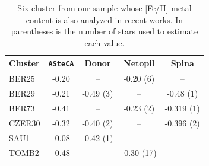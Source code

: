 \documentclass{aa}
\begin{document}
  \begin{table}
  \caption{Six cluster from our sample whose [Fe/H] metal content is also
  analyzed in recent works. In parentheses is the number of stars used to estimate
  each value.}
  \label{tab:metal}
  \centering
  \begin{tabular}{lcccc}
  \hline\hline
  Cluster & \texttt{ASteCA} & Donor & Netopil & Spina \\
  \hline %
   BER25  & -0.20  & --         & -0.20 (6)  & -- \\
   BER29  & -0.21  & -0.49 (3)  & --         & -0.48 (1)  \\
   BER73  & -0.41  & --         & -0.23 (2)  & -0.319 (1)  \\
   CZER30 & -0.32  & -0.40 (2)  & --         & -0.396 (2)  \\
   SAU1   & -0.08  & -0.42 (1)  & --         & --  \\
   TOMB2  & -0.48  & --         & -0.30 (17) & -- \\
  \hline
  \end{tabular}
  \end{table}
\end{document}
